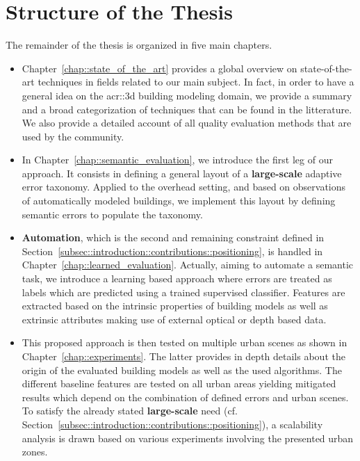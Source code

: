 \section{Structure of the Thesis}
    \label{sec::introduction::structure_of_thesis}
    The remainder of the thesis is organized in five main chapters.\\
    \begin{itemize}[label=\(\blacktriangleright\)]
        \item Chapter~\ref{chap::state_of_the_art} provides a global overview on state-of-the-art techniques in fields related to our main subject.
                In fact, in order to have a general idea on the \gls{acr::3d} building modeling domain, we provide a summary and a broad categorization of techniques that can be found in the litterature.
                We also provide a detailed account of all quality evaluation methods that are used by the community.
        \item In Chapter~\ref{chap::semantic_evaluation}, we introduce the first leg of our approach.
                It consists in defining a general layout of a \textbf{large-scale} adaptive error taxonomy.
                Applied to the overhead setting, and based on observations of automatically modeled buildings, we implement this layout by defining semantic errors to populate the taxonomy.
        \item \textbf{Automation}, which is the second and remaining constraint defined in Section~\ref{subsec::introduction::contributions::positioning}, is handled in Chapter~\ref{chap::learned_evaluation}.
                Actually, aiming to automate a semantic task, we introduce a learning based approach where errors are treated as labels which are predicted using a trained supervised classifier.
                Features are extracted based on the intrinsic properties of building models as well as extrinsic attributes making use of external optical or depth based data.
        \item This proposed approach is then tested on multiple urban scenes as shown in Chapter~\ref{chap::experiments}.
                The latter provides in depth details about the origin of the evaluated building models as well as the used algorithms.
                The different baseline features are tested on all urban areas yielding mitigated results which depend on the combination of defined errors and urban scenes.
                To satisfy the already stated \textbf{large-scale} need (cf. Section~\ref{subsec::introduction::contributions::positioning}), a scalability analysis is drawn based on various experiments involving the presented urban zones.

\end{itemize}
